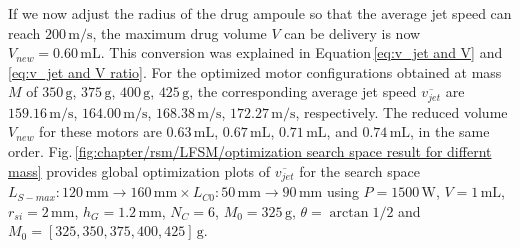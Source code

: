             
            If we now adjust the radius of the drug ampoule so that the average jet speed can reach $200\,\mathrm{m/s}$, the maximum drug volume $V$ can be delivery is now $V_{new}=0.60\,\mathrm{mL}$. This conversion was explained in Equation\,\ref{eq:v_jet and V} and \ref{eq:v_jet and V ratio}. For the optimized motor configurations obtained at mass $M$ of $350\,\mathrm{g}$, $375\,\mathrm{g}$, $400\,\mathrm{g}$, $425\,\mathrm{g}$, the corresponding average jet speed $\overline{v_{jet}}$ are $159.16\,\mathrm{m/s}$, $164.00\,\mathrm{m/s}$, $168.38\,\mathrm{m/s}$, $172.27\,\mathrm{m/s}$, respectively. The reduced volume $V_{new}$ for these motors are $0.63\,\mathrm{mL}$, $0.67\,\mathrm{mL}$, $0.71\,\mathrm{mL}$, and $0.74\,\mathrm{mL}$, in the same order. Fig.\,\ref{fig:chapter/rsm/LFSM/optimization search space result for differnt mass} provides global optimization plots of $\overline{v_{jet}}$ for the search space $L_{S-max}:120\,\mathrm{mm}\rightarrow 160\,\mathrm{mm} \times L_{C0}:50\,\mathrm{mm}\rightarrow 90\,\mathrm{mm}$ using $P=1500\,\mathrm{W}$, $V=1\,\mathrm{mL}$, $r_{si}=2\,\mathrm{mm}$, $h_G=1.2\,\mathrm{mm}$, $N_C=6$, $M_0=325\,\mathrm{g}$, $\theta = \arctan{1/2}$ and $M_0=[325,350,375,400,425]\,\mathrm{g}$. 
 
